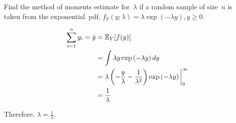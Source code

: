 \begin{problem}
   Find the method of moments estimate for~$\lambda$ if a random sample of size~$n$ is taken from the exponential~pdf, ${f_Y(y;\lambda) = \lambda \exp(-\lambda y), y \geq 0}$.
\end{problem}

\begin{align*}
  \sum_{i=1}^{n} y_i = \bar{y} &= \mathbb{E}_{Y}\lbrack f(y)\rbrack \\
                               &= \int \lambda y \exp\left( -\lambda y  \right) dy \\
                               &= \lambda \left(-\frac{y}{\lambda} - \frac{1}{\lambda^2}\right) \exp\left(-\lambda y\right) \bigg\vert_{0}^{\infty} \\
                               &= \frac{1}{\lambda}
\end{align*}

Therefore, ${\lambda = \boxed{\frac{1}{\lambda}}}$.
